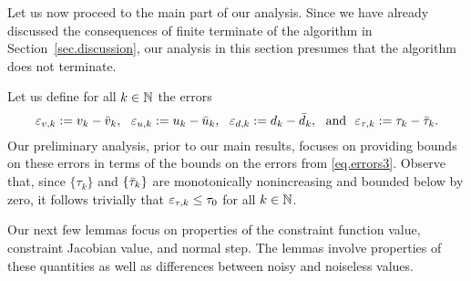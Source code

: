 Let us now proceed to the main part of our analysis.  Since we have already discussed the consequences of finite terminate of the algorithm in Section~\ref{sec.discussion}, our analysis in this section presumes that the algorithm does not terminate.

Let us define for all $k \in \mathbb{N}$ the errors
\begin{equation}\label{eq.errors_k}
  \varepsilon_{v,k} := v_k - {\bar v}_k,\ \ \varepsilon_{u,k} := u_k - {\bar u}_k,\ \ \varepsilon_{d,k} := d_k - {\bar d}_k,\ \ \text{and}\ \ \varepsilon_{\tau,k} := \tau_k - {\bar \tau}_k.
\end{equation}
Our preliminary analysis, prior to our main results, focuses on providing bounds on these errors in terms of the bounds on the errors from \eqref{eq.errors3}.  Observe that, since $\{\tau_k\}$ and $\{{\bar \tau}_k\}$ are monotonically nonincreasing and bounded below by zero, it follows trivially that $\varepsilon_{\tau,k} \leq \tau_0$ for all $k \in \mathbb{N}$.

Our next few lemmas focus on properties of the constraint function value, constraint Jacobian value, and normal step.  The lemmas involve properties of these quantities as well as differences between noisy and noiseless values.

